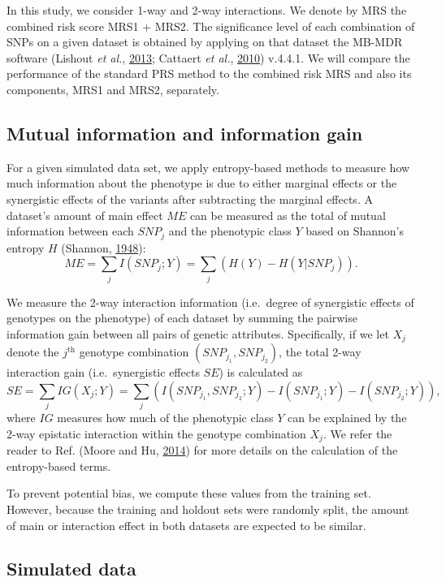\documentclass{ws-procs11x85}
\begin{document}
In this study, we consider 1-way and 2-way interactions. We denote by
MRS the combined risk score MRS1 + MRS2. The significance level of each
combination of SNPs on a given dataset is obtained by applying on that
dataset the MB-MDR software (Lishout \emph{et al.},
\protect\hyperlink{ref-S6nj6BFK}{2013}; Cattaert \emph{et al.},
\protect\hyperlink{ref-16AnEAMje}{2010}) v.4.4.1. We will compare the
performance of the standard PRS method to the combined risk MRS and also
its components, MRS1 and MRS2, separately.

\subsection{Mutual information and information
gain}\label{mutual-information-and-information-gain}

For a given simulated data set, we apply entropy-based methods to
measure how much information about the phenotype is due to either
marginal effects or the synergistic effects of the variants after
subtracting the marginal effects. A dataset's amount of main effect
\(ME\) can be measured as the total of mutual information between each
\(SNP_j\) and the phenotypic class \(Y\) based on Shannon's
entropy \(H\) (Shannon, \protect\hyperlink{ref-yzGboP1g}{1948}):
\[ME = \sum_{j} I(SNP_j; Y) = \sum_{j} \left(H(Y) - H(Y|SNP_j)\right).\]

We measure the 2-way interaction information (i.e.~degree of synergistic
effects of genotypes on the phenotype) of each dataset by summing the
pairwise information gain between all pairs of genetic attributes.
Specifically, if we let \(X_j\) denote the \(j^\textrm{th}\) genotype
combination \((SNP_{j_1}, SNP_{j_2})\), the total 2-way interaction gain
(i.e.~synergistic effects \(SE\)) is calculated as
\[SE = \sum_{j}IG(X_j; Y) = \sum_{j} \left(I(SNP_{j_1}, SNP_{j_2}; Y) - I(SNP_{j_1}; Y) - I(SNP_{j_2}; Y)\right),\]
where \(IG\) measures how much of the phenotypic class \(Y\) can be
explained by the 2-way epistatic interaction within the genotype
combination \(X_j\). We refer the reader to Ref. (Moore and Hu,
\protect\hyperlink{ref-1FFMLUZxb}{2014}) for more details on the
calculation of the entropy-based terms.

To prevent potential bias, we compute these values from the training set.
However, because the training and holdout sets were randomly split, the amount of main or interaction effect in both datasets are expected to be similar.

\subsection{Simulated data}\label{simulated-data}
\end{document}

